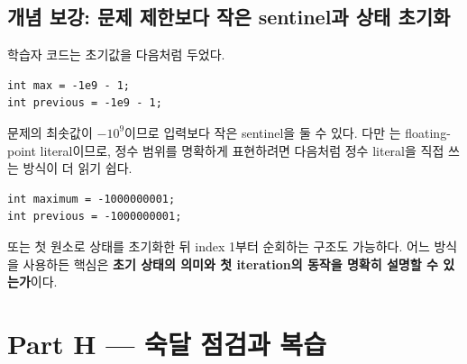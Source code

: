 \subsection{개념 보강: 문제 제한보다 작은 sentinel과 상태 초기화}
학습자 코드는 초기값을 다음처럼 두었다.
\begin{lstlisting}
int max = -1e9 - 1;
int previous = -1e9 - 1;
\end{lstlisting}

문제의 최솟값이 $-10^9$이므로 입력보다 작은 sentinel을 둘 수 있다. 다만 는 floating-point literal이므로, 정수 범위를 명확하게 표현하려면 다음처럼 정수 literal을 직접 쓰는 방식이 더 읽기 쉽다.
\begin{lstlisting}
int maximum = -1000000001;
int previous = -1000000001;
\end{lstlisting}

또는 첫 원소로 상태를 초기화한 뒤 index 1부터 순회하는 구조도 가능하다. 어느 방식을 사용하든 핵심은 \textbf{초기 상태의 의미와 첫 iteration의 동작을 명확히 설명할 수 있는가}이다.

\section{Part H --- 숙달 점검과 복습}

